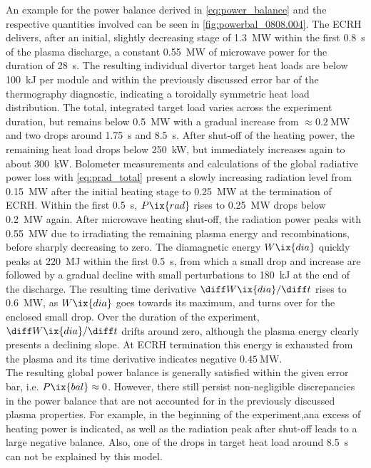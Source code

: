             An example for the power balance derived in \cref{eq:power_balance} and the respective quantities involved can be seen in \cref{fig:powerbal_0808.004}. The ECRH delivers, after an initial, slightly decreasing stage of \SI{1.3}{\mega\watt} within the first \SI{0.8}{\second} of the plasma discharge, a constant \SI{0.55}{\mega\watt} of microwave power for the duration of \SI{28}{\second}. The resulting individual divertor target heat loads are below \SI{100}{\kilo\joule} per module and within the previously discussed error bar of the thermography diagnostic, indicating a toroidally symmetric heat load distribution. The total, integrated target load varies across the experiment duration, but remains below \SI{0.5}{\mega\watt} with a gradual increase from $\approx\SI{0.2}{\mega\watt}$ and two drops around \SI{1.75}{\second} and \SI{8.5}{\second}. After shut-off of the heating power, the remaining heat load drops below \SI{250}{\kilo\watt}, but immediately increases again to about \SI{300}{\kilo\watt}. Bolometer measurements and calculations of the global radiative power loss with \cref{eq:prad_total} present a slowly increasing radiation level from \SI{0.15}{\mega\watt} after the initial heating stage to \SI{0.25}{\mega\watt} at the termination of ECRH. Within the first \SI{0.5}{\second}, $P\ix{rad}$ rises to \SI{0.25}{\mega\watt} drops below \SI{0.2}{\mega\watt} again. After microwave heating shut-off, the radiation power peaks with \SI{0.55}{\mega\watt} due to irradiating the remaining plasma energy and recombinations, before sharply decreasing to zero. The diamagnetic energy $W\ix{dia}$ quickly peaks at \SI{220}{\mega\joule} within the first \SI{0.5}{\second}, from which a small drop and increase are followed by a gradual decline with small perturbations to \SI{180}{\kilo\joule} at the end of the discharge. The resulting time derivative $\diff W\ix{dia}/\diff t$ rises to \SI{0.6}{\mega\watt}, as $W\ix{dia}$ goes towards its maximum, and turns over for the enclosed small drop. Over the duration of the experiment, $\diff W\ix{dia}/\diff t$ drifts around zero, although the plasma energy clearly presents a declining slope. At ECRH termination this energy is exhausted from the plasma and its time derivative indicates negative $\SI{0.45}{\mega\watt}$.\\%
            The resulting global power balance is generally satisfied within the given error bar, i.e. $P\ix{bal}\approx 0$. However, there still persist non-negligible discrepancies in the power balance that are not accounted for in the previously discussed plasma properties. For example, in the beginning of the experiment,ana excess of heating power is indicated, as well as the radiation peak after shut-off leads to a large negative balance. Also, one of the drops in target heat load around \SI{8.5}{\second} can not be explained by this model.\\%
